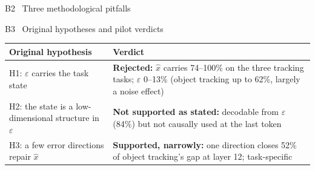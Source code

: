 \documentclass[aspectratio=169,10pt]{beamer}
\begin{document}
\begin{frame}{B2 \textperiodcentered\ Three methodological pitfalls}
  \centering
\end{frame}

\begin{frame}{B3 \textperiodcentered\ Original hypotheses and pilot verdicts}
  \small
  \vspace{4pt}
  \begin{center}
  \renewcommand{\arraystretch}{1.3}
  \begin{tabularx}{\textwidth}{@{}p{} X@{}}
    \toprule
    \textbf{Original hypothesis} & \textbf{Verdict} \\
    \midrule
    H1: $\varepsilon$ carries the task state & \textbf{Rejected:} $\hat{x}$ carries 74--100\% on the three tracking
      tasks; $\varepsilon$ 0--13\% (object tracking up to 62\%, largely a noise effect) \\
    H2: the state is a low-dimensional structure in $\varepsilon$ & \textbf{Not supported as stated:} decodable from
      $\varepsilon$ (84\%) but not causally used at the last token \\
    H3: a few error directions repair $\hat{x}$ & \textbf{Supported, narrowly:} one direction closes 52\% of object
      tracking's gap at layer 12; task-specific \\
    \bottomrule
  \end{tabularx}
  \end{center}
\end{frame}
\end{document}
